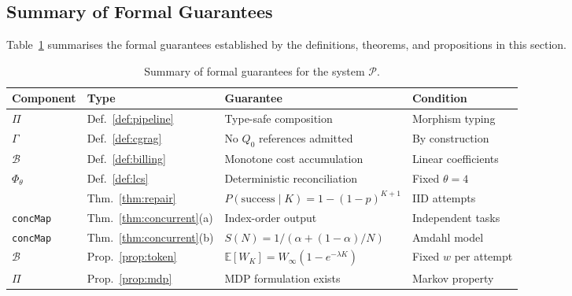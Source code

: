 \subsection{Summary of Formal Guarantees}

Table~\ref{tab:formal_guarantees} summarises the formal guarantees established
by the definitions, theorems, and propositions in this section.

\begin{table}[h!]
\centering
\caption{Summary of formal guarantees for the \sys{} system $\mathcal{P}$.}
\label{tab:formal_guarantees}
\begin{tabular}{llll}
\toprule
Component & Type & Guarantee & Condition \\
\midrule
$\Pi$ & Def.~\ref{def:pipeline} & Type-safe composition & Morphism typing \\
$\Gamma$ & Def.~\ref{def:cgrag} & No $Q_0$ references admitted & By construction \\
$\mathcal{B}$ & Def.~\ref{def:billing} & Monotone cost accumulation & Linear coefficients \\
$\Phi_\theta$ & Def.~\ref{def:lcs} & Deterministic reconciliation & Fixed $\theta=4$ \\
\tvg{} & Thm.~\ref{thm:repair} & $P(\text{success}\mid K)=1-(1-p)^{K+1}$ & IID attempts \\
\texttt{concMap} & Thm.~\ref{thm:concurrent}(a) & Index-order output & Independent tasks \\
\texttt{concMap} & Thm.~\ref{thm:concurrent}(b) & $S(N)=1/(\alpha+(1-\alpha)/N)$ & Amdahl model \\
$\mathcal{B}$ & Prop.~\ref{prop:token} & $\mathbb{E}[W_K]=W_\infty(1-e^{-\lambda K})$ & Fixed $w$ per attempt \\
$\Pi$ & Prop.~\ref{prop:mdp} & MDP formulation exists & Markov property \\
\bottomrule
\end{tabular}
\end{table}
